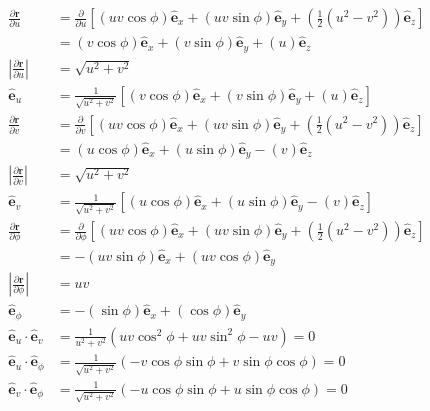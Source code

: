 \documentclass[12pt]{article}
\newenvironment{problem}[2][Problem]{\begin{trivlist}
\item[\hskip \labelsep {\bfseries #1}\hskip \labelsep {\bfseries #2.}]}{\end{trivlist}}
\begin{document}
\begin{problem}{2.e.i}
\end{problem}
\begin{align*}
	\frac{\partial \mathbf{r}}{\partial u} &= \frac{\partial}{\partial u}
		[ (uv\cos\phi) \hat{\mathbf{e}}_x + (uv\sin\phi) \hat{\mathbf{e}}_y
		+ (\frac{1}{2}(u^2 - v^2)) \hat{\mathbf{e}}_z ] \\
	&= (v\cos\phi) \hat{\mathbf{e}}_x + (v\sin\phi) \hat{\mathbf{e}}_y
		+ (u) \hat{\mathbf{e}}_z \\
	\left| \frac{\partial \mathbf{r}}{\partial u} \right| &= \sqrt{u^2 + v^2} \\
	\hat{\mathbf{e}}_u &= \frac{1}{\sqrt{u^2 + v^2}} [ (v\cos\phi)
		\hat{\mathbf{e}}_x + (v\sin\phi) \hat{\mathbf{e}}_y + (u)
		\hat{\mathbf{e}}_z ] \\
	\frac{\partial \mathbf{r}}{\partial v} &= \frac{\partial}{\partial v}
		[ (uv\cos\phi) \hat{\mathbf{e}}_x + (uv\sin\phi) \hat{\mathbf{e}}_y
		+ (\frac{1}{2}(u^2 - v^2)) \hat{\mathbf{e}}_z ] \\
	&= (u\cos\phi) \hat{\mathbf{e}}_x + (u\sin\phi) \hat{\mathbf{e}}_y
		- (v) \hat{\mathbf{e}}_z \\
	\left| \frac{\partial \mathbf{r}}{\partial v} \right| &= \sqrt{u^2 + v^2} \\
	\hat{\mathbf{e}}_v &= \frac{1}{\sqrt{u^2 + v^2}} [ (u\cos\phi)
		\hat{\mathbf{e}}_x + (u\sin\phi) \hat{\mathbf{e}}_y - (v)
		\hat{\mathbf{e}}_z ] \\
	\frac{\partial \mathbf{r}}{\partial \phi} &= \frac{\partial}{\partial \phi}
		[ (uv\cos\phi) \hat{\mathbf{e}}_x + (uv\sin\phi) \hat{\mathbf{e}}_y
		+ (\frac{1}{2}(u^2 - v^2)) \hat{\mathbf{e}}_z ] \\
	&= -(uv\sin\phi) \hat{\mathbf{e}}_x + (uv\cos\phi) \hat{\mathbf{e}}_y \\
	\left| \frac{\partial \mathbf{r}}{\partial \phi} \right| &= uv \\
	\hat{\mathbf{e}}_\phi &= -(\sin\phi) \hat{\mathbf{e}}_x + (\cos\phi)
		\hat{\mathbf{e}}_y \\
	\hat{\mathbf{e}}_u \cdot \hat{\mathbf{e}}_v &= \frac{1}{u^2 + v^2}
		(uv\cos^2\phi + uv\sin^2\phi - uv) = 0 \\
	\hat{\mathbf{e}}_u \cdot \hat{\mathbf{e}}_\phi &= \frac{1}{\sqrt{u^2 +
		v^2}} (-v\cos\phi\sin\phi + v\sin\phi\cos\phi) = 0 \\
	\hat{\mathbf{e}}_v \cdot \hat{\mathbf{e}}_\phi &= \frac{1}{\sqrt{u^2 +
		v^2}} (-u\cos\phi\sin\phi + u\sin\phi\cos\phi) = 0 \\

\end{align*}
\end{document}
